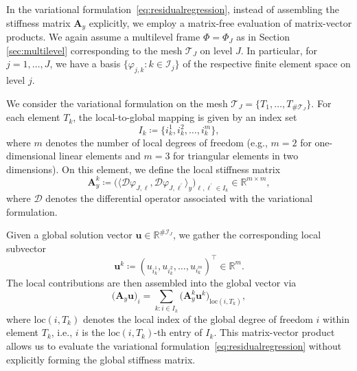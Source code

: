 \documentclass[a4paper,11pt]{amsart}
\numberwithin{equation}{section}
\theoremstyle{definition}
\theoremstyle{remark}
\theoremstyle{plain}
\begin{document}
In the variational formulation~\eqref{eq:residualregression}, instead of assembling the stiffness matrix $\mathbf{A}_{y}$ explicitly, we employ a matrix-free evaluation of matrix-vector products. 
We again assume a multilevel frame $\Phi = \Phi_J$ as in Section \ref{sec:multilevel} corresponding to the mesh $\mathcal T_J$ on level $J$.
In particular, for $j=1,\ldots,J$, we have a basis $\{ \varphi_{j,k} \colon k \in \mathcal{I}_j \}$ of the respective finite element space on level $j$. 

We consider the variational formulation on the mesh $\mathcal T_J = \{ T_1, \ldots, T_{\# \mathcal T_J} \}$. 
For each element $T_k$, the local-to-global mapping is given by an index set 
\[
I_{k}\coloneq\{i_{k}^{1},i_{k}^{2},\ldots,i_{k}^{m}\},
\]
where $m$ denotes the number of local degrees of freedom (e.g., $m=2$ for one-dimensional linear elements and $m=3$ for triangular elements in two dimensions). 
On this element, we define the local stiffness matrix
\[
\mathbf{A}_{y}^{k}\coloneq 
\bigl( \langle \mathcal{D}\varphi_{J,\ell},  \mathcal{D}\varphi_{J,\ell^{\prime}} \rangle_{y} \bigr)_{\ell,\ell^{\prime}\in I_{k}}
\in\mathbb{R}^{m\times m},
\]
where $\mathcal{D}$ denotes the differential operator associated with the variational formulation.

Given a global solution vector $\mathbf{u}\in\mathbb{R}^{\#\mathcal{I}_{J}}$, we gather the corresponding local subvector
\[
\mathbf{u}^{k} \coloneq (u_{i_{k}^{1}},u_{i_{k}^{2}},\ldots,u_{i_{k}^{m}})^{\intercal}\in\mathbb{R}^{m}.
\]
The local contributions are then assembled into the global vector via
\[
\bigl(\mathbf{A}_{y}\mathbf{u}\bigr)_{i}
=\sum_{k: i\in I_{k}}
\bigl(\mathbf{A}_{y}^{k}\mathbf{u}^{k}\bigr)_{\mathrm{loc}(i,T_{k})},
\]
where $\mathrm{loc}(i,T_{k})$ denotes the local index of the global degree of freedom $i$ within element $T_{k}$, i.e., $i$ is the $\mathrm{loc}(i,T_{k})$-th entry of $I_{k}$. 
This matrix-vector product allows us to evaluate the variational formulation~\eqref{eq:residualregression} without explicitly forming the global stiffness matrix.
\end{document}

